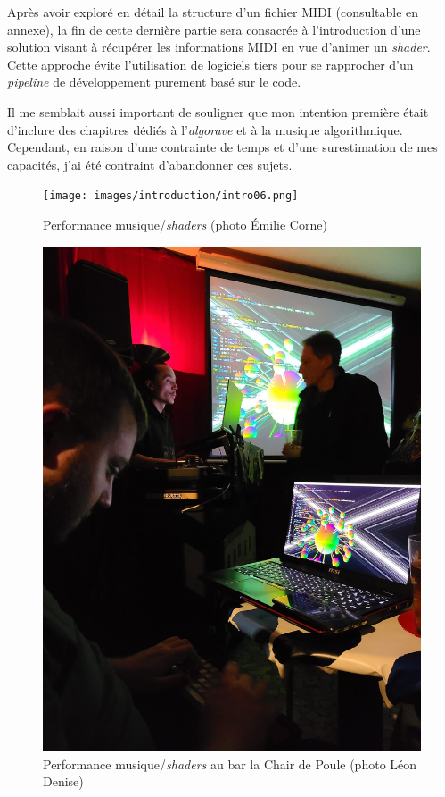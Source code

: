 Après avoir exploré en détail la structure d'un fichier MIDI (consultable en annexe), la fin de cette dernière partie sera consacrée à l'introduction d'une solution visant à récupérer les informations MIDI en vue d'animer un \textit{shader}. Cette approche évite l'utilisation de logiciels tiers pour se rapprocher d'un \textit{pipeline} de développement purement basé sur le code.

Il me semblait aussi important de souligner que mon intention première était d'inclure des chapitres dédiés à l'\textit{algorave} et à la musique algorithmique. Cependant, en raison d'une contrainte de temps et d'une surestimation de mes capacités, j'ai été contraint d'abandonner ces sujets.

\newpage


\begin{figure}[htbp]
  \begin{minipage}[b]{0.45\linewidth}
    \centering
    \texttt{[image: images/introduction/intro06.png]}
    \caption{Performance musique/\textit{shaders} (photo Émilie Corne)}
    \label{intro06}
  \end{minipage}
  \hspace{0.1\linewidth} %
  \begin{minipage}[b]{0.45\linewidth}
    \centering
    \includegraphics[width=\linewidth]{images/introduction/intro02.jpg}
    \caption{Performance musique/\textit{shaders} au bar la Chair de Poule (photo Léon Denise)}
    \label{intro02}
  \end{minipage}
\end{figure}

